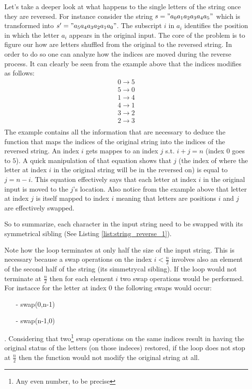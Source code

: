 Let's take a deeper look at what happens to the single letters of the string once they are reversed. For instance consider the string $s="a_0 a_1 a_2 a_3 a_4 a_5"$ which is transformed into $s'="a_5 a_4 a_3 a_2 a_1 a_0"$. The subscript $i$ in $a_i$ identifies the position in which the letter $a_i$ appears in the original input. The core of the problem is to figure our how are letters shuffled from the original to the reversed string. In order to do so one can analyze how the indices are moved during the reverse process. It can clearly be seen from the example above that the indices modifies as follows:
\[
\begin{array}{l}
    0 \rightarrow 5  \\ 
    5 \rightarrow 0  \\ 
    1 \rightarrow 4  \\ 
    4 \rightarrow 1  \\ 
    3 \rightarrow 2  \\ 
    2 \rightarrow 3  \\ 
  \end{array}
\]
The example contains all the information that are necessary to deduce the function that maps the indices of the original string into the indices of the reversed string. An index $i$ gets mappes to an index $j$ s.t. $i+j = n$ (index $0$ goes to $5$). A quick manipulation of that equation shows that $j$ (the index of where the letter at index $i$ in the original string will be in the reversed on) is equal to $j = n-i$. 
This equation effectively says that  each letter at index $i$ in the original input is moved to the $j$'s location.
Also notice from the example above that letter  at index $j$ is itself mapped to index $i$ meaning that letters are positions $i$ and $j$ are effectively swapped.

So to summarize, each character in the input string need to be swapped with its symmetrical sibling (See Listing \ref{list:string_reverse_1}).



Note how the loop terminates at only half the size of the input string. This is necessary because a swap operations on the index $i<\frac{n}{2}$ involves also an element of the second half of the string (its simmetrycal sibling).  If the loop would not terminate at $\frac{n}{2}$ then for each element $i$ two swap operations would be performed. For instacce for the letter at index $0$ the following swaps would occur:
\begin{itemize}
	\item[-] swap(0,n-1)
	\item[-] swap(n-1,0)
\end{itemize}.
Considering that two\footnote{Any even number, to be precise} swap operations on the same indices result in having the original status of the letters (on those indeces) restored, if the loop does not stop at $\frac{n}{2}$ then the function would not modify the original string at all. 


